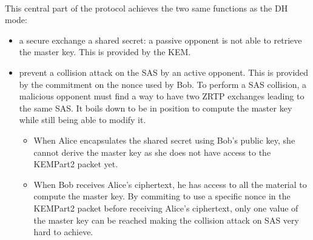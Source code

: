 \documentclass[a4paper,11pt]{article}
\begin{document}
\paragraph*{}This central part of the protocol achieves the two same functions as the DH mode:
\begin{itemize}
  \item a secure exchange a shared secret: a passive opponent is not able to retrieve the master key. This is provided by the KEM.
  \item prevent a collision attack on the SAS by an active opponent. This is provided by the commitment on the nonce used by Bob. To perform a SAS collision, a malicious opponent must find a way to have two ZRTP exchanges leading to the same SAS. It boils down to be in position to compute the master key while still being able to modify it.
  \begin{itemize}
    \item When Alice encapsulates the shared secret using Bob's public key, she cannot derive the master key as she does not have access to the KEMPart2 packet yet.
    \item When Bob receives Alice's ciphertext, he has access to all the material to compute the master key. By commiting to use a specific nonce in the KEMPart2 packet before receiving Alice's ciphertext, only one value of the master key can be reached making the collision attack on SAS very hard to achieve.
  \end{itemize}
\end{itemize}
\end{document}
